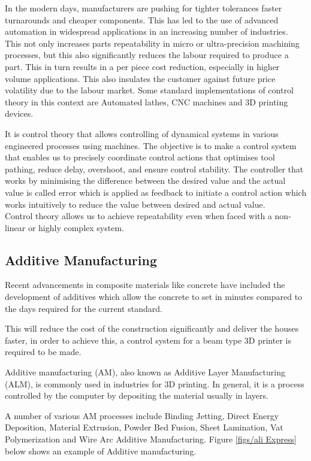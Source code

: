 \documentclass{UoNMCHA}
\numberwithin{equation}{section}
\begin{document}
	In the modern days, manufacturers are pushing for tighter tolerances faster turnarounds and cheaper components. This has led to the use of advanced automation in widespread applications in an increasing number of industries. This not only increases parts repeatability in micro or ultra-precision machining processes, but this also significantly reduces the labour required to produce a part. This in turn results in a per piece cost reduction, especially in higher volume applications. This also insulates the customer against future price volatility due to the labour market. Some standard implementations of control theory in this context are Automated lathes, CNC machines and 3D printing devices. \par
	It is control theory that allows controlling of dynamical systems in various engineered processes using machines. The objective is to make a control system that enables us to precisely coordinate control actions that optimises tool pathing, reduce delay, overshoot, and ensure control stability. The controller that works by minimising the difference between the desired value and the actual value is called error which is applied as feedback to initiate a control action which works intuitively to reduce the value between desired and actual value. \\
	Control theory allows us to achieve repeatability even when faced with a non-linear or highly complex system. 
	
	\subsection{Additive Manufacturing}\label{Additive Manufacturing}
	
	Recent advancements in composite materials like concrete have included the development of additives which allow the concrete to set in minutes compared to the days required for the current standard.\par
	
	This will reduce the cost of the construction significantly and deliver the houses faster, in order to achieve this, a control system for a beam type 3D printer is required to be made.
	
	
	Additive manufacturing (AM), also known as Additive Layer Manufacturing (ALM), is commonly used in industries for 3D printing. In general, it is a process controlled by the computer by depositing the material usually in layers. 
	
	\newpage
	A number of various AM processes include Binding Jetting, Direct Energy Deposition, Material Extrusion, Powder Bed Fusion, Sheet Lamination, Vat Polymerization and Wire Arc Additive Manufacturing. Figure \ref{figs/ali Express} below shows an example of Additive manufacturing.\\
	
\end{document}
